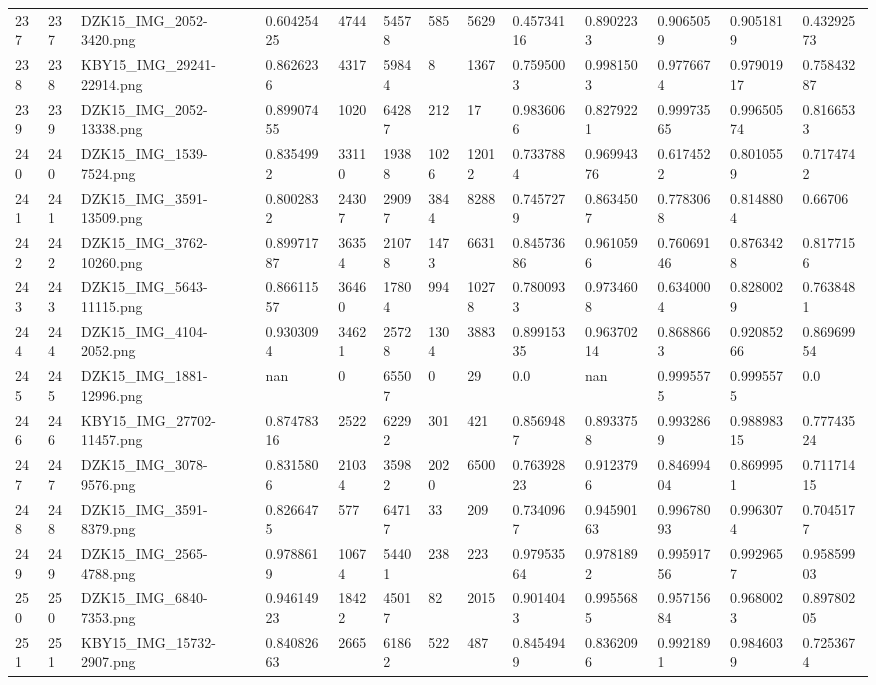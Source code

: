 \documentclass[11pt, a4paper, twoside]{report}
\begin{document}
\begin{longtable}[c]{@{}lllllllllllll@{}}
237 & 237 & DZK15\_IMG\_2052-3420.png & 0.60425425 & 4744 & 54578 & 585 & 5629 & 0.45734116 & 0.8902233 & 0.9065059 & 0.9051819 & 0.43292573 \\
238 & 238 & KBY15\_IMG\_29241-22914.png & 0.8626236 & 4317 & 59844 & 8 & 1367 & 0.7595003 & 0.9981503 & 0.9776674 & 0.97901917 & 0.75843287 \\
239 & 239 & DZK15\_IMG\_2052-13338.png & 0.89907455 & 1020 & 64287 & 212 & 17 & 0.9836066 & 0.8279221 & 0.99973565 & 0.99650574 & 0.8166533 \\
240 & 240 & DZK15\_IMG\_1539-7524.png & 0.8354992 & 33110 & 19388 & 1026 & 12012 & 0.7337884 & 0.96994376 & 0.6174522 & 0.8010559 & 0.7174742 \\
241 & 241 & DZK15\_IMG\_3591-13509.png & 0.8002832 & 24307 & 29097 & 3844 & 8288 & 0.7457279 & 0.8634507 & 0.7783068 & 0.8148804 & 0.66706 \\
242 & 242 & DZK15\_IMG\_3762-10260.png & 0.89971787 & 36354 & 21078 & 1473 & 6631 & 0.84573686 & 0.9610596 & 0.76069146 & 0.8763428 & 0.8177156 \\
243 & 243 & DZK15\_IMG\_5643-11115.png & 0.86611557 & 36460 & 17804 & 994 & 10278 & 0.7800933 & 0.9734608 & 0.6340004 & 0.8280029 & 0.7638481 \\
244 & 244 & DZK15\_IMG\_4104-2052.png & 0.9303094 & 34621 & 25728 & 1304 & 3883 & 0.89915335 & 0.96370214 & 0.8688663 & 0.92085266 & 0.86969954 \\
245 & 245 & DZK15\_IMG\_1881-12996.png & nan & 0 & 65507 & 0 & 29 & 0.0 & nan & 0.9995575 & 0.9995575 & 0.0 \\
246 & 246 & KBY15\_IMG\_27702-11457.png & 0.87478316 & 2522 & 62292 & 301 & 421 & 0.8569487 & 0.8933758 & 0.9932869 & 0.98898315 & 0.77743524 \\
247 & 247 & DZK15\_IMG\_3078-9576.png & 0.8315806 & 21034 & 35982 & 2020 & 6500 & 0.76392823 & 0.9123796 & 0.84699404 & 0.8699951 & 0.71171415 \\
248 & 248 & DZK15\_IMG\_3591-8379.png & 0.8266475 & 577 & 64717 & 33 & 209 & 0.7340967 & 0.94590163 & 0.99678093 & 0.9963074 & 0.7045177 \\
249 & 249 & DZK15\_IMG\_2565-4788.png & 0.9788619 & 10674 & 54401 & 238 & 223 & 0.97953564 & 0.9781892 & 0.99591756 & 0.9929657 & 0.95859903 \\
250 & 250 & DZK15\_IMG\_6840-7353.png & 0.94614923 & 18422 & 45017 & 82 & 2015 & 0.9014043 & 0.9955685 & 0.95715684 & 0.9680023 & 0.89780205 \\
251 & 251 & KBY15\_IMG\_15732-2907.png & 0.84082663 & 2665 & 61862 & 522 & 487 & 0.8454949 & 0.8362096 & 0.9921891 & 0.9846039 & 0.7253674 \\

\end{longtable}
\end{document}
